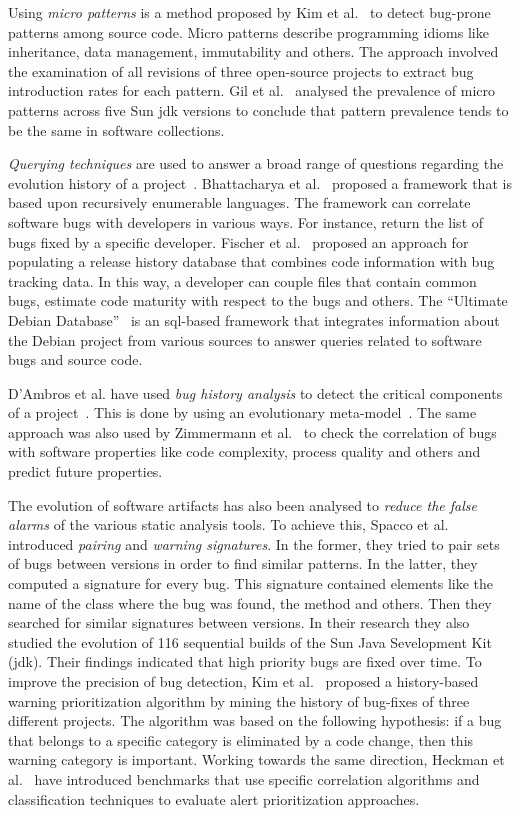\documentclass[conference]{llncs}
\begin{document}
Using {\it micro patterns} is a method proposed by Kim et al.~\cite{KPW06}
to detect bug-prone patterns among source code. Micro patterns describe programming
idioms like inheritance, data management, immutability and others. The approach involved
the examination of all revisions of three open-source projects to extract bug
introduction rates for each pattern. Gil et al.~\cite{GM05} analysed the
prevalence of micro patterns across five Sun {\sc jdk} versions to conclude that
pattern prevalence tends to be the same in software collections.

{\it Querying techniques} are used to answer a broad range of questions
regarding the evolution history of a project~\cite{HG05}. Bhattacharya et
al.~\cite{BN11}\cite{B11} proposed a framework that is based upon
recursively enumerable languages. The framework can correlate software
bugs with developers in various ways. For instance, return the list of
bugs fixed by a specific developer. Fischer et al.~\cite{FPG03} proposed
an approach for populating a release history database that combines code
information with bug tracking data. In this way, a developer can couple files
that contain common bugs, estimate code maturity with respect to the bugs
and others. The ``Ultimate Debian Database''~\cite{NZ10} is an {\sc sql}-based
framework that integrates information about the Debian project from various
sources to answer queries related to software bugs and source code.

D'Ambros et al. have used {\it bug history analysis} to detect
the critical components of a project~\cite{D08}. This is done by using an
evolutionary meta-model~\cite{DL08}. The same approach was
also used by Zimmermann et al.~\cite{ZNA08} to check the correlation
of bugs with software properties like code complexity, process quality and others
and predict future properties.

The evolution of software artifacts has also been analysed to {\it reduce the false
alarms} of the various static analysis tools. To achieve this, Spacco et
al.~\cite{SHP06} introduced {\it pairing} and {\it warning signatures}. In the
former, they tried to pair sets of bugs between versions in order to find
similar patterns. In the latter, they computed a signature for every bug. This
signature contained elements like the name of the class where the bug was found,
the method and others. Then they searched for similar signatures between
versions. In their research they also studied the evolution of 116 sequential
builds of the Sun Java Sevelopment Kit ({\sc jdk}). Their findings indicated that
high priority bugs are fixed over time. To improve the precision of bug
detection, Kim et al.~\cite{KE07b}\cite{KE07} proposed a history-based warning
prioritization algorithm by mining the history of bug-fixes of three
different projects. The algorithm was based on the following hypothesis: if a
bug that belongs to a specific category is eliminated by a code change, then
this warning category is important. Working towards the same direction, Heckman
et al.~\cite{HW09}\cite{HW08} have introduced benchmarks that use specific
correlation algorithms and classification techniques to evaluate alert
prioritization approaches.
\end{document}
